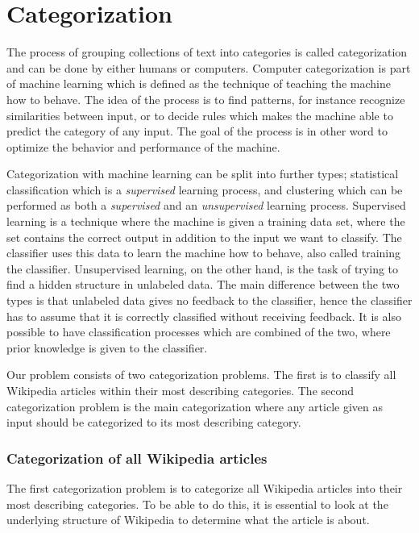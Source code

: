 \section{Categorization}
The process of grouping collections of text into categories is called categorization and can be done by either humans or computers. Computer categorization is part of machine learning which is defined as the technique of teaching the machine how to behave. The idea of the  process is to find patterns, for instance recognize similarities between input, or to decide rules which makes the machine able to predict the category of any input. The goal of the process is in other word to optimize the behavior and performance of the machine.

Categorization with machine learning can be split into further types; statistical classification which is a \emph{supervised} learning process, and clustering which can be performed as both %
a \emph{supervised} and an \emph{unsupervised} learning process. Supervised learning is a technique where the machine is given a training data set, where the set contains the correct output in addition to the input we want to classify. The classifier uses this data to learn the machine how to behave, also called training the classifier. Unsupervised learning, on the other hand, is the task of trying to find a hidden structure in unlabeled data. The main difference between the two types is that unlabeled data gives no feedback to the classifier, hence the classifier has to assume that it is correctly classified without receiving feedback. It is also possible to have classification processes which are combined of the two, where prior knowledge is given to the classifier. 


Our problem consists of two categorization problems. The first is to classify all Wikipedia articles within their most describing categories. The second categorization problem is the main categorization where any article given as input should be categorized to its most describing category.  

\subsubsection{Categorization of all Wikipedia articles}
The first categorization problem is to categorize all Wikipedia articles into their most describing categories. To be able to do this, it is essential to look at the underlying structure of Wikipedia to determine what the article is about. 

